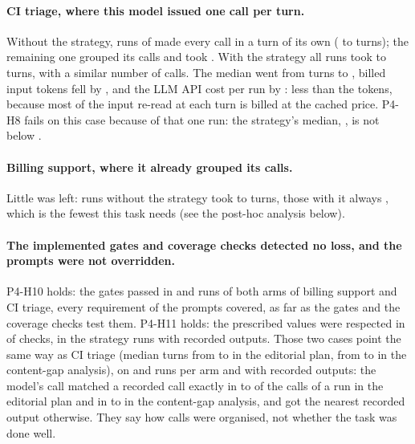 \paragraph{CI triage, where this model issued one call per turn.} Without the strategy, \SthreeEThreeLongRunsv{}
runs of \SthreeEThreeRunsCv{} made every call in a turn of its own (\SthreeEThreeLongMinv{} to
\SthreeEThreeLongMaxv{} turns); the remaining one grouped its calls and took \SthreeEThreeTurnsRminv. With the strategy all
runs took \SthreeEThreeTurnsSminv{} to \SthreeEThreeTurnsSmaxv{} turns, with a similar number of calls. The median
went from \SthreeEThreeTurnsRv{} turns to \SthreeEThreeTurnsSv, billed input tokens fell by
\SthreeEThreeInputChangev, and the LLM API cost per run by \SthreeEThreeCostv: less than the tokens, because most of the
input re-read at each turn is billed at the cached price. P4-H8 fails on this case because of that one run: the
strategy's median, \SthreeEThreeTurnsSv, is not below \SthreeEThreeTurnsRminv.

\paragraph{Billing support, where it already grouped its calls.} Little was left: runs without the strategy took
\SthreeEThreeTurnsRminiv{} to \SthreeEThreeTurnsRmaxiv{} turns, those with it always \SthreeEThreeTurnsSiv, which
is the fewest this task needs (see the post-hoc analysis below).

\paragraph{The implemented gates and coverage checks detected no loss, and the prompts were not overridden.}
P4-H10 holds: the gates passed in
\SthreeHTenGatesiv{} and \SthreeHTenGatesv{} runs of both arms of billing support and CI triage, every requirement of
the prompts covered, as far as the gates and the coverage checks test them. P4-H11 holds: the prescribed values were respected in \SthreeHElevenPassed{} of
\SthreeHElevenChecks{} checks, in the \SthreeHElevenRuns{} strategy runs with recorded outputs. Those two cases point
the same way as CI triage (median turns from \SthreeEThreeTurnsRi{} to \SthreeEThreeTurnsSi{} in the editorial
plan, from \SthreeEThreeTurnsRii{} to \SthreeEThreeTurnsSii{} in the content-gap analysis), on
\SthreeEThreeRunsRi{} and \SthreeEThreeRunsRii{} runs per arm and with recorded outputs: the model's call matched a
recorded call exactly in \SthreeExactMini{} to \SthreeExactMaxi{} of the calls of a run in the editorial plan and in
\SthreeExactMinii{} to \SthreeExactMaxii{} in the content-gap analysis, and got the nearest recorded output otherwise.
They say how calls were organised, not whether the task was done well.

